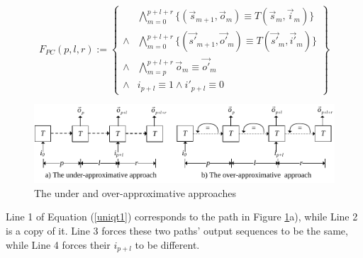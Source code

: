 \documentclass[runningheads,a4paper,orivec]{llncs}
\begin{document}
\begin{equation}\label{uniqt1}
F_{PC}(p,l,r):=
\left\{
\begin{array}{cc}
&\bigwedge_{m=0}^{p+l+r}
\{
(\vec{s}_{m+1},\vec{o}_m)\equiv T(\vec{s}_m,\vec{i}_m)
\}
\\
\wedge&\bigwedge_{m=0}^{p+l+r}
\{
(\vec{s'}_{m+1},\vec{o'}_m)\equiv T(\vec{s'}_m,\vec{i'}_m)
\}
\\
\wedge&\bigwedge_{m=p}^{p+l+r}\vec{o}_m\equiv \vec{o'}_m \\
\wedge& i_{p+l}\equiv 1 \wedge  i'_{p+l}\equiv 0 
\end{array}
\right\}
\end{equation}

\begin{figure}[t]
\begin{center}
\includegraphics[width=\textwidth]{pc}
\end{center}
\caption{The under and over-approximative approaches}
  \label{fig_pc}
\end{figure}


Line 1 of Equation (\ref{uniqt1}) corresponds to the path in Figure \ref{fig_pc}a),
while Line 2 is a copy of it.
Line 3 forces these two paths' output sequences to be the same,
while Line 4 forces their $i_{p+l}$ to be different.
\end{document}

